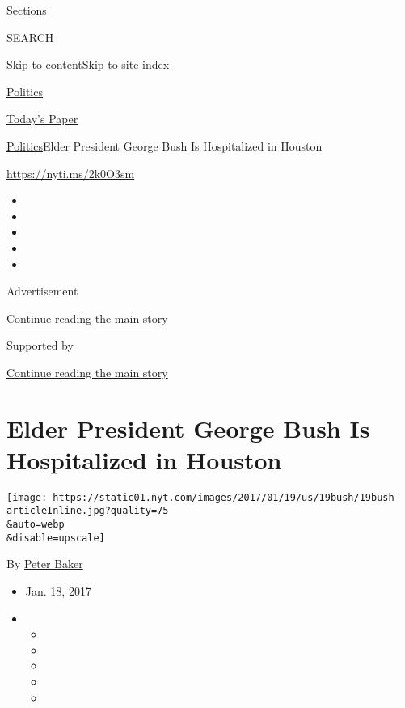 Sections

SEARCH

\protect\hyperlink{site-content}{Skip to
content}\protect\hyperlink{site-index}{Skip to site index}

\href{https://www.nytimes.com/section/politics}{Politics}

\href{https://myaccount.nytimes.com/auth/login?response_type=cookie\&client_id=vi}{}

\href{https://www.nytimes.com/section/todayspaper}{Today's Paper}

\href{/section/politics}{Politics}\textbar{}Elder President George Bush
Is Hospitalized in Houston

\url{https://nyti.ms/2k0O3sm}

\begin{itemize}
\item
\item
\item
\item
\item
\end{itemize}

Advertisement

\protect\hyperlink{after-top}{Continue reading the main story}

Supported by

\protect\hyperlink{after-sponsor}{Continue reading the main story}

\hypertarget{elder-president-george-bush-is-hospitalized-in-houston}{%
\section{Elder President George Bush Is Hospitalized in
Houston}\label{elder-president-george-bush-is-hospitalized-in-houston}}

\texttt{[image: https://static01.nyt.com/images/2017/01/19/us/19bush/19bush-articleInline.jpg?quality=75\\\&auto=webp\\\&disable=upscale]}

By \href{http://www.nytimes.com/by/peter-baker}{Peter Baker}

\begin{itemize}
\item
  Jan. 18, 2017
\item
  \begin{itemize}
  \item
  \item
  \item
  \item
  \item
  \end{itemize}
\end{itemize}

